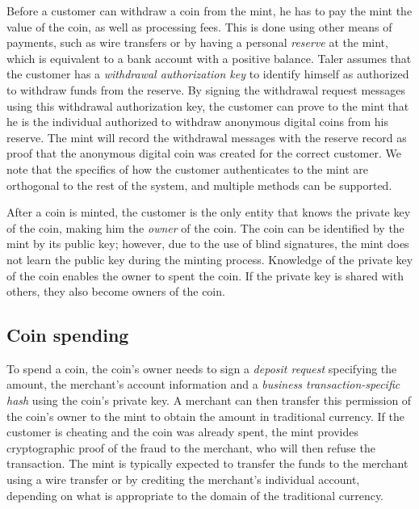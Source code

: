 \documentclass{llncs}
\begin{document}
Before a customer can withdraw a coin from the mint,
he has to pay the mint the value of the coin, as well as processing fees.
This is done using other means of payments, such as wire transfers or
by having a personal {\em reserve} at the mint,
 which is equivalent to a bank account with a positive balance.
Taler assumes that the customer has a {\em withdrawal authorization key}
to identify himself as authorized to withdraw funds from the reserve.
By signing the withdrawal request messages using this withdrawal
authorization key, the customer can prove to the mint that he is the
individual authorized to withdraw anonymous digital coins from his reserve.
The mint will record the withdrawal messages with the reserve record as
proof that the anonymous digital coin was created for the correct
customer.  We note that the specifics of how the customer authenticates
to the mint are orthogonal to the rest of the system, and
 multiple methods can be supported.

After a coin is minted, the customer is the only entity that knows the
private key of the coin, making him the \emph{owner} of the coin.
The coin can be identified by the mint by its public key; however, due
to the use of blind signatures, the mint does not learn the public key
during the minting process.  Knowledge of the private key of the coin
enables the owner to spent the coin.  If the private key is shared
with others, they also become owners of the coin.

\subsection{Coin spending}

To spend a coin, the coin's owner needs to sign a {\em deposit
  request} specifying the amount, the merchant's account information
and a {\em business transaction-specific hash} using the coin's
private key.  A merchant can then transfer this permission of the
coin's owner to the mint to obtain the amount in traditional currency.
If the customer is cheating and the coin was already spent, the mint
provides cryptographic proof of the fraud to the merchant, who will
then refuse the transaction.  The mint is typically expected to
transfer the funds to the merchant using a wire transfer or by
crediting the merchant's individual account, depending on what is
appropriate to the domain of the traditional currency.
\end{document}
